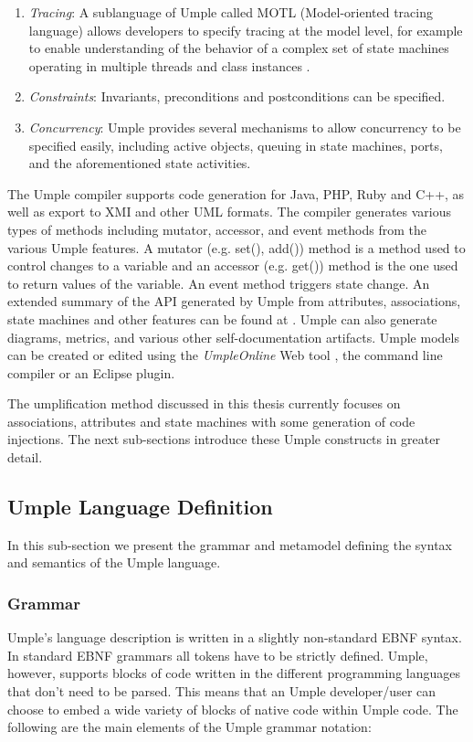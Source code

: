 \begin{enumerate}
 \item 	\textit{Tracing}:  A sublanguage of Umple called MOTL (Model-oriented tracing language) allows developers to specify tracing at the model level, for example to enable understanding of the behavior of a complex set of state machines operating in multiple threads and class instances \cite{UmpleTracing}.
 \item 	\textit{Constraints}: Invariants, preconditions and postconditions can be specified.
 \item 	\textit{Concurrency}: Umple provides several mechanisms to allow concurrency to be specified easily, including active objects, queuing in state machines, ports, and the aforementioned state activities.
\end{enumerate}

The Umple compiler supports code generation for Java, PHP, Ruby and C++, as well as export to XMI and other UML formats. The compiler generates various types of methods including mutator, accessor, and event methods from the various Umple features. A mutator (e.g. set(), add()) method is a method used to control changes to a variable and an accessor (e.g. get()) method is the one used to return values of the variable. An event method triggers state change. An extended summary of the API generated by Umple from attributes, associations, state machines and other features can be found at \cite{UmpleAPI}. Umple can also generate diagrams, metrics, and various other self-documentation artifacts. Umple models can be created or edited using the \textit{UmpleOnline} Web tool \cite{UmpleOnline}, the command line compiler or an Eclipse plugin. 

The umplification method discussed in this thesis currently focuses on associations,  attributes and state machines with some generation of code injections. The next sub-sections introduce these Umple constructs in greater detail.

\subsection{Umple Language Definition}
In this sub-section we present the grammar and metamodel defining the syntax and semantics of the Umple language. 

\subsubsection{Grammar}

Umple's language description is written in a slightly non-standard EBNF syntax. In standard EBNF grammars all tokens have to be strictly defined. Umple, however, supports blocks of code written in the different programming languages that don't need to be parsed. This means that an Umple developer/user can choose to embed a wide variety of blocks of native code within Umple code. The following are the main elements of the Umple grammar notation:

